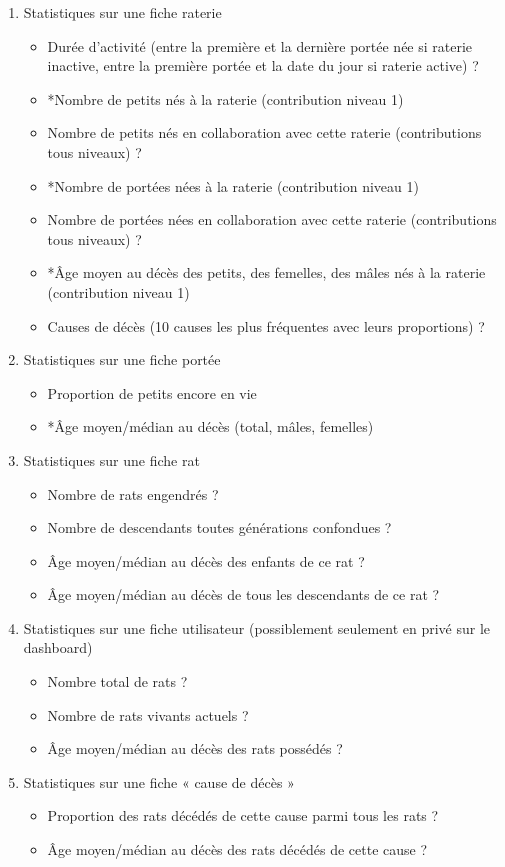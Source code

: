 ﻿\documentclass[a4paper,10pt]{article}
\begin{document}
\begin{enumerate}
\item Statistiques sur une fiche raterie
\begin{itemize}
\item Durée d'activité (entre la première et la dernière portée née si raterie inactive, entre la première portée et la date du jour si raterie active) ?
\item *Nombre de petits nés à la raterie (contribution niveau 1)
\item Nombre de petits nés en collaboration avec cette raterie (contributions tous niveaux) ?
\item *Nombre de portées nées à la raterie (contribution niveau 1)
\item Nombre de portées nées en collaboration avec cette raterie (contributions tous niveaux) ?
\item *Âge moyen au décès des petits, des femelles, des mâles nés à la raterie (contribution niveau 1)
\item Causes de décès (10 causes les plus fréquentes avec leurs proportions) ?
\end{itemize}
\item Statistiques sur une fiche portée
\begin{itemize}
\item Proportion de petits encore en vie
\item *Âge moyen/médian au décès (total, mâles, femelles)
\end{itemize}
\item Statistiques sur une fiche rat
\begin{itemize}
\item Nombre de rats engendrés ?
\item Nombre de descendants toutes générations confondues ?
\item Âge moyen/médian au décès des enfants de ce rat ?
\item Âge moyen/médian au décès de tous les descendants de ce rat ?
\end{itemize}
\item Statistiques sur une fiche utilisateur (possiblement seulement en privé sur le dashboard)
\begin{itemize}
\item Nombre total de rats ?
\item Nombre de rats vivants actuels ?
\item Âge moyen/médian au décès des rats possédés ?
\end{itemize}
\item Statistiques sur une fiche « cause de décès »
\begin{itemize}
\item Proportion des rats décédés de cette cause parmi tous les rats ?
\item Âge moyen/médian au décès des rats décédés de cette cause ? 
\end{itemize} 
\end{enumerate}
\end{document}
